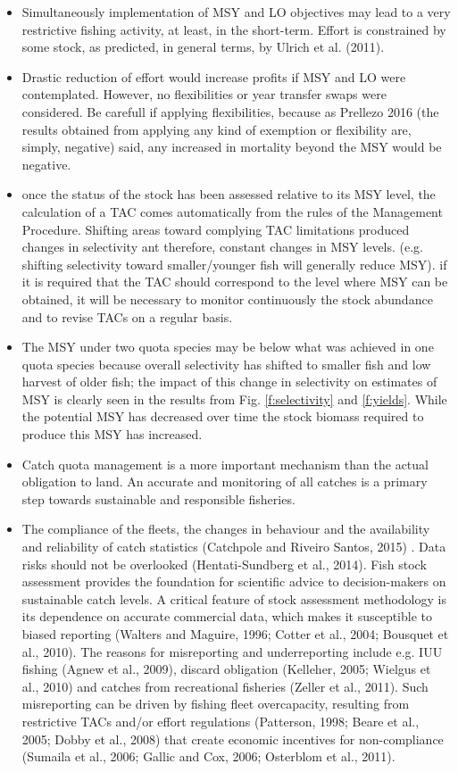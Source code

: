 \documentclass[12pt,oneline,a4paper,numbib]{ouparticle}
\numberwithin{equation}{subsection} %
\begin{document}
\begin{itemize}
\item{Simultaneously implementation of MSY and LO objectives may lead to a very restrictive fishing activity, at least, in the short-term. Effort is constrained by some stock, as predicted, in general terms, by Ulrich et al. (2011).}
\item{Drastic reduction of effort would increase profits if MSY and LO were contemplated. However, no flexibilities or year transfer swaps were considered. Be carefull if applying flexibilities, because as Prellezo 2016 (the results obtained from applying any kind of exemption or flexibility are, simply, negative) said, any increased in mortality beyond the MSY would be negative.}
\item{once the status of the stock has been assessed relative to its MSY level, the calculation of a TAC comes automatically from the rules of the Management Procedure. Shifting areas toward complying TAC limitations produced changes in selectivity ant therefore, constant changes in MSY levels. (e.g. shifting selectivity toward smaller/younger fish will generally reduce MSY). if it is required that the TAC should correspond to the level where MSY can be obtained, it will be necessary to monitor continuously the stock abundance and to revise TACs on a regular basis.}
\item{The  MSY under two quota species may be below what was achieved in one quota species because overall selectivity has shifted to smaller fish and low harvest of older fish; the impact of this change in selectivity on estimates of MSY is clearly seen in the results from Fig. \ref{f:selectivity} and \ref{f:yields}. While  the  potential  MSY  has decreased over time the stock biomass required to produce this MSY has increased.}
\item{Catch quota management is a more important mechanism than the actual obligation to land. An accurate and monitoring of all catches is a primary step towards sustainable and responsible fisheries.}
\item{The compliance of the fleets, the changes in behaviour and the availability and reliability of catch statistics (Catchpole and Riveiro Santos, 2015) . Data risks should not be overlooked (Hentati-Sundberg et al., 2014). Fish stock assessment provides the foundation for scientific advice to decision-makers on sustainable catch levels. A critical feature of stock assessment methodology is its dependence on accurate commercial data, which makes it susceptible to biased reporting (Walters and Maguire, 1996; Cotter et al., 2004; Bousquet et al., 2010). The reasons for misreporting and underreporting include e.g. IUU fishing (Agnew et al., 2009), discard obligation (Kelleher, 2005; Wielgus et al., 2010) and catches from recreational fisheries (Zeller et al., 2011). Such misreporting can be driven by fishing fleet overcapacity, resulting from restrictive TACs and/or effort regulations (Patterson, 1998; Beare et al., 2005; Dobby et al., 2008) that create economic incentives for non-compliance (Sumaila et al., 2006; Gallic and Cox, 2006; Osterblom et al., 2011).}

\end{itemize}
\end{document}
